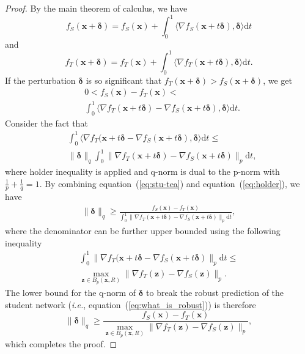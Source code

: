 \documentclass[journal]{IEEEtran}
\newcommand{\Eref}[1]{equation~(\ref{#1})}
\newcommand{\bx}{\bm{x}}
\newcommand{\bz}{\bm{z}}
\newcommand{\bdelta}{\bm{\delta}}
\begin{document}
\begin{proof}
By the main theorem of calculus, we have
\begin{equation}
  f_S(\bx+\bdelta) = f_S(\bx)+\int_0^1\langle\nabla f_S(\bx+t\bdelta),\bdelta\rangle{\mathrm d}t
  \label{eq:stu_calculus}
\end{equation}
and
\begin{equation}
  f_T(\bx+\bdelta) = f_T(\bx)+\int_0^1\langle\nabla f_T(\bx+t\bdelta),\bdelta\rangle{\mathrm d}t.
  \label{eq:tea_calculus}
\end{equation}
If the perturbation $\bdelta$ is so significant that $f_T(\bx+\bdelta)>f_S(\bx+\bdelta)$, we get
\begin{equation}
  \begin{split}
  &  0<f_S(\bx) -  f_T(\bx) < \\ 
  &  \int_0^1\langle\nabla f_T(\bx+t\bdelta)-\nabla f_S(\bx+t\bdelta),\bdelta\rangle{\mathrm d}t.
  \end{split}
  \label{eq:stu-tea}
\end{equation}
Consider the fact that
\begin{equation}
\begin{split}
  &  \int_0^1 \langle\nabla f_T(\bx+t\bdelta - \nabla f_S(\bx+t\bdelta),\bdelta\rangle{\mathrm d}t\leq \\ 
  &  \|\bdelta\|_q\int_0^1\|\nabla f_T(\bx+t\bdelta) - \nabla f_S(\bx+t\bdelta)\|_p{\mathrm d}t,
\end{split}
\label{eq:holder}
\end{equation}
where holder inequality is applied and q-norm is dual to the p-norm with $\frac{1}{p}+\frac{1}{q}=1$. By combining \Eref{eq:stu-tea} and \Eref{eq:holder}, we have
\begin{equation}
\begin{aligned}
  \|\bdelta\|_q \geq \frac{f_S(\bx) - f_T(\bx)} {\int_0^1\|\nabla f_T(\bx+t\bdelta) - \nabla f_S(\bx+t\bdelta)\|_p{\mathrm d}t},
\end{aligned}
\label{eq:got_delta}
\end{equation}
where the denominator can be further upper bounded using the following inequality
\begin{equation}
\begin{aligned}
   \int_0^1\|\nabla f_T(\bx+t\bdelta - \nabla f_S(\bx+t\bdelta)\|_p{\mathrm d}t \leq \\  
   \max_{\bz\in B_p(\bx,R)}\|\nabla f_T(\bz)-\nabla f_S(\bz)\|_p.
\end{aligned}
\label{eq:upper_denominator}
\end{equation}
The lower bound for the q-norm of $\bdelta$ to break the robust prediction of the student network (\emph{i.e.}, \Eref{eq:what_is_robust}) is therefore
\begin{equation}
   \|\bdelta\|_q\geq \frac{f_S(\bx) - f_T(\bx)}{\max_{\bz\in B_p(\bx,R)}\|\nabla f_T(\bz)-\nabla f_S(\bz)\|_p},
   \label{eq:delta_up_de}
\end{equation}
which completes the proof.
\end{proof}
\end{document}

